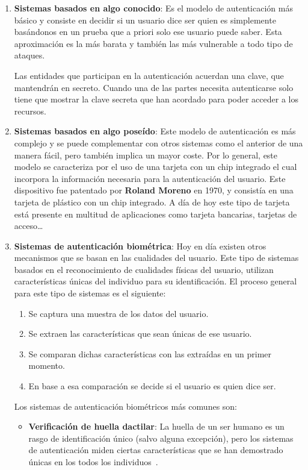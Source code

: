 \begin{enumerate}
    \item \textbf{Sistemas basados en algo conocido}: Es el modelo de autenticación más básico y consiste en decidir si un usuario dice ser quien es simplemente basándonos en un prueba que a priori solo ese usuario puede saber.
    Esta aproximación es la más barata y también las más vulnerable a todo tipo de ataques.
    
    Las entidades que participan en la autenticación acuerdan una clave, que mantendrán en secreto. Cuando una de las partes necesita autenticarse solo tiene que mostrar la clave secreta que han acordado para poder acceder a los recursos.
    
    \item \textbf{Sistemas basados en algo poseído}: Este modelo de autenticación es más complejo y se puede complementar con otros sistemas como el anterior de una manera fácil, pero también implica un mayor coste. Por lo general, este modelo se caracteriza por el uso de una tarjeta con un chip integrado el cual incorpora la información necesaria para la autenticación del usuario.    
    Este dispositivo fue patentado por \textbf{Roland Moreno} en 1970, y consistía en una tarjeta de plástico con un chip integrado. A día de hoy este tipo de tarjeta está presente en multitud de aplicaciones como tarjeta bancarias, tarjetas de acceso\dots
\item \textbf{Sistemas de autenticación biométrica}: Hoy en día existen otros mecanismos que se basan en las cualidades del usuario.    
    Este tipo de sistemas basados en el reconocimiento de cualidades físicas del usuario, utilizan características únicas del individuo para su identificación. El proceso general para este tipo de sistemas es el siguiente:
    \begin{enumerate}[label={\arabic*.}]
        \item Se captura una muestra de los datos del usuario.
        \item Se extraen las características que sean únicas de ese usuario.
        \item Se comparan dichas características con las extraídas en un primer momento.
        \item En base a esa comparación se decide si el usuario es quien dice ser.
    \end{enumerate}
    
    Los sistemas de autenticación biométricos más comunes son:
    \begin{itemize}
        \item \textbf{Verificación de huella dactilar}: La huella de un ser humano es un rasgo de identificación único (salvo alguna excepción), pero los sistemas de autenticación miden ciertas características que se han demostrado únicas en los todos los individuos~\cite{Juan_Vucetich}.
        

\end{itemize}
\end{enumerate}
